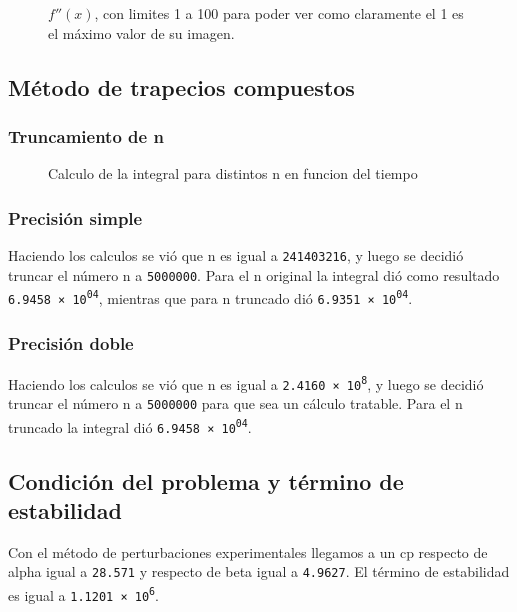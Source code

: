 \documentclass[11pt,a4paper]{article}
\begin{document}
\begin{figure}[H]
	\caption{\(f''(x)\), con limites 1 a 100 para poder ver como claramente el 1 es el máximo valor de su imagen.}
	\label{fig:funcionderivada2zoom}
\end{figure}

\subsection{Método de trapecios compuestos}

\subsubsection{Truncamiento de n}

\begin{figure}[H]
	\caption{Calculo de la integral para distintos n en funcion del tiempo}
	\label{fig:calcularn}
\end{figure}

\subsubsection{Precisión simple}

Haciendo los calculos se vió que n es igual a \texttt{241403216}, y luego se decidió truncar el número n a \texttt{5000000}. Para el n original la integral dió como resultado \texttt{\num{6.9458e+04}}, mientras que para n truncado dió \texttt{\num{6.9351e+04}}.

\subsubsection{Precisión doble}

Haciendo los calculos se vió que n es igual a \texttt{\num{2.4160e8}}, y luego se decidió truncar el número n a \texttt{5000000} para que sea un cálculo tratable. Para el n truncado la integral dió \texttt{\num{6.9458e+04}}.

\subsection{Condición del problema y término de estabilidad}

Con el método de perturbaciones experimentales llegamos a un cp respecto de alpha igual a \texttt{28.571} y respecto de beta igual a \texttt{4.9627}. El término de estabilidad es igual a \texttt{\num{1.1201e6}}.
\end{document}
